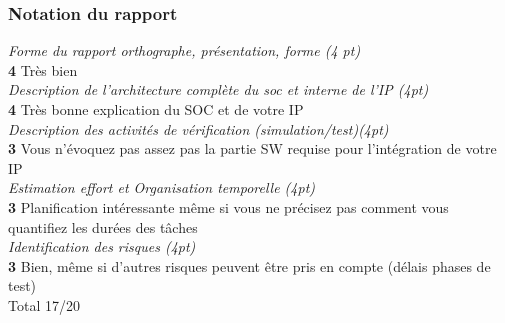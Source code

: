\subsubsection{Notation du rapport}
\noindent
\emph{Forme du rapport orthographe, présentation, forme (4 pt)}\\
\textbf{4} Très bien\\
\noindent
\emph{Description de l'architecture complète du soc et interne de l'IP (4pt)}\\
\textbf{4} Très bonne explication du SOC et  de votre IP\\
\noindent
\emph{Description des activités de vérification (simulation/test)(4pt)}\\
\textbf{3} Vous n'évoquez pas assez pas la partie SW requise pour l'intégration de votre IP\\
\noindent
\emph{Estimation effort et Organisation temporelle (4pt)}\\
\textbf{3} Planification intéressante même si vous ne précisez pas comment vous quantifiez les durées des tâches\\
\noindent
\emph{Identification des risques (4pt)} \\
\textbf{3} Bien, même si d'autres risques peuvent être pris en compte (délais phases de test)\\

\gap
Total 17/20

